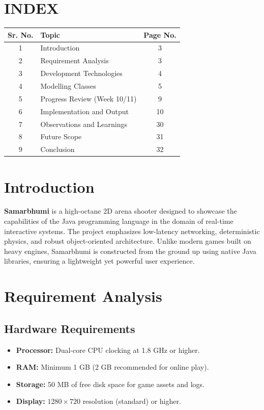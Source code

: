 \documentclass[a4paper,12pt]{article}
\begin{document}
\newpage

\section*{INDEX}

\renewcommand{\arraystretch}{1.2}
\begin{tabular}{|c|l|c|}
    \hline
    \textbf{Sr. No.} & \textbf{Topic} & \textbf{Page No.} \\ \hline
    1 & Introduction & 3 \\ \hline
    2 & Requirement Analysis & 3 \\ \hline
    3 & Development Technologies & 4 \\ \hline
    4 & Modelling Classes & 5 \\ \hline
    5 & Progress Review (Week 10/11) & 9 \\ \hline
    6 & Implementation and Output & 10 \\ \hline
    7 & Observations and Learnings & 30 \\ \hline
    8 & Future Scope & 31 \\ \hline
    9 & Conclusion & 32 \\ \hline
\end{tabular}

\newpage

\section{Introduction}
\noindent \textbf{Samarbhumi} is a high-octane 2D arena shooter designed to showcase the capabilities of the Java programming language in the domain of real-time interactive systems. The project emphasizes low-latency networking, deterministic physics, and robust object-oriented architecture. Unlike modern games built on heavy engines, Samarbhumi is constructed from the ground up using native Java libraries, ensuring a lightweight yet powerful user experience.

\section{Requirement Analysis}

\subsection{Hardware Requirements}
\begin{itemize}
    \item \textbf{Processor:} Dual-core CPU clocking at 1.8 GHz or higher.
    \item \textbf{RAM:} Minimum 1 GB (2 GB recommended for online play).
    \item \textbf{Storage:} 50 MB of free disk space for game assets and logs.
    \item \textbf{Display:} $1280 \times 720$ resolution (standard) or higher.
\end{itemize}
\end{document}

